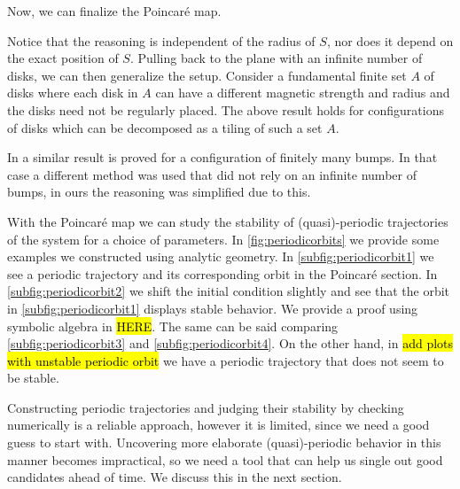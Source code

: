 Now, we can finalize the Poincar\'e map.



Notice that the reasoning is independent of the radius of $S$, nor does it depend on the exact position of $S$. Pulling back to the plane with an infinite number of disks, we can then generalize the setup. Consider a fundamental finite set $A$ of disks where each disk in $A$ can have a different magnetic strength and radius and the disks need not be regularly placed. The above result holds for configurations of disks which can be decomposed as a tiling of such a set $A$.

In \cite{Knauf_2017} a similar result is proved for a configuration of finitely many bumps. In that case a different method was used that did not rely on an infinite number of bumps, in ours the reasoning was simplified due to this.

With the Poincar\'e map we can study the stability of (quasi)-periodic trajectories of the system for a choice of parameters. In \cref{fig:periodicorbits} we provide some examples we constructed using analytic geometry. In \cref{subfig:periodicorbit1} we see a periodic trajectory and its corresponding orbit in the Poincar\'e section. In \cref{subfig:periodicorbit2} we shift the initial condition slightly and see that the orbit in \cref{subfig:periodicorbit1} displays stable behavior. We provide a proof using symbolic algebra in \hl{HERE}. The same can be said comparing \cref{subfig:periodicorbit3} and \cref{subfig:periodicorbit4}. On the other hand, in \hl{add plots with unstable periodic orbit} we have a periodic trajectory that does not seem to be stable.

Constructing periodic trajectories and judging their stability by checking numerically is a reliable approach, however it is limited, since we need a good guess to start with. Uncovering more elaborate (quasi)-periodic behavior in this manner becomes impractical, so we need a tool that can help us single out good candidates ahead of time. We discuss this in the next section.




